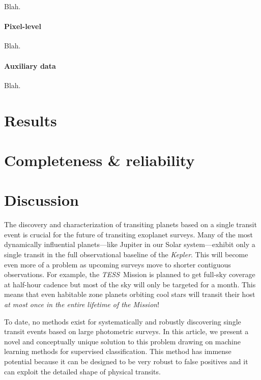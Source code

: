\documentclass[12pt,preprint]{aastex}
\newcommand{\project}[1]{\textsl{#1}}
\newcommand{\kepler}{\project{Kepler}}
\newcommand{\tess}{\project{TESS}}
\newcommand{\paper}{article}
\newcommand{\sectlabel}[1]{\label{sect:#1}}
\begin{document}
Blah.

\paragraph{Pixel-level}

Blah.

\paragraph{Auxiliary data}

Blah.


\section{Results}



\section{Completeness \& reliability}



\section{Discussion}\sectlabel{discussion}

The discovery and characterization of transiting planets based on a single
transit event is crucial for the future of transiting exoplanet surveys.
Many of the most dynamically influential planets---like Jupiter in our Solar
system---exhibit only a single transit in the full observational baseline of
the \kepler.
This will become even more of a problem as upcoming surveys move to shorter
contiguous observations.
For example, the \tess\ Mission is planned to get full-sky coverage at
half-hour cadence but most of the sky will only be targeted for a month.
This means that even habitable zone planets orbiting cool stars will transit
their host \emph{at most once in the entire lifetime of the Mission}!

To date, no methods exist for systematically and robustly discovering single
transit events based on large photometric surveys.
In this \paper, we present a novel and conceptually unique solution to this
problem drawing on machine learning methods for supervised classification.
This method has immense potential because it can be designed to be very robust
to false positives and it can exploit the detailed shape of physical transits.
\end{document}
